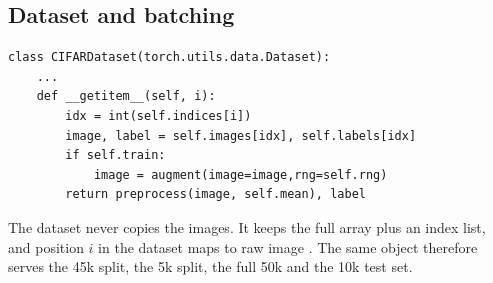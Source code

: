 \subsection{Dataset and batching}

\begin{lstlisting}[firstnumber=37]
class CIFARDataset(torch.utils.data.Dataset):
    ...
    def __getitem__(self, i):
        idx = int(self.indices[i])
        image, label = self.images[idx], self.labels[idx]
        if self.train:
            image = augment(image=image,rng=self.rng)
        return preprocess(image, self.mean), label
\end{lstlisting}

\begin{idea}
The dataset never copies the images. It keeps the full array plus an index list, and position $i$ in the dataset maps to raw image . The same object therefore serves the 45k split, the 5k split, the full 50k and the 10k test set.
\end{idea}

\begin{center}
\end{center}

